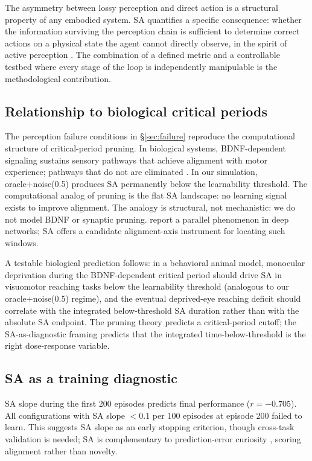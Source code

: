 \documentclass{article}
\begin{document}
The asymmetry between lossy perception and direct action is a structural property
of any embodied system. SA quantifies a specific consequence: whether the
information surviving the perception chain is sufficient to determine correct
actions on a physical state the agent cannot directly observe, in the spirit
of active perception \citep{bajcsy1988active, aloimonos1988active}. The
combination of a defined metric and a controllable testbed where every stage
of the loop is independently manipulable is the methodological contribution.

\subsection{Relationship to biological critical periods}

The perception failure conditions in \S\ref{sec:failure} reproduce the
computational structure of critical-period pruning. In biological systems,
BDNF-dependent signaling sustains sensory pathways that achieve alignment with
motor experience; pathways that do not are eliminated
\citep{huang1999bdnf, rossi1999monocular}. In our simulation, oracle+noise(0.5)
produces SA permanently below the learnability threshold. The computational analog
of pruning is the flat SA landscape: no learning signal exists to improve alignment.
The analogy is structural, not mechanistic: we do not model BDNF or synaptic pruning.
\citet{achille2019critical} report a parallel phenomenon in deep networks;
SA offers a candidate alignment-axis instrument for locating such windows.

A testable biological prediction follows: in a behavioral animal model, monocular
deprivation during the BDNF-dependent critical period should drive SA in
visuomotor reaching tasks below the learnability threshold (analogous to our
oracle+noise(0.5) regime), and the eventual deprived-eye reaching deficit should
correlate with the integrated below-threshold SA duration rather than with the
absolute SA endpoint. The pruning theory predicts a critical-period cutoff;
the SA-as-diagnostic framing predicts that the integrated time-below-threshold
is the right dose-response variable.

\subsection{SA as a training diagnostic}

SA slope during the first 200 episodes predicts final performance ($r = -0.705$).
All configurations with SA slope $< 0.1$ per 100 episodes at episode 200 failed
to learn. This suggests SA slope as an early stopping criterion, though
cross-task validation is needed; SA is complementary to prediction-error
curiosity \citep{pathak2017curiosity}, scoring alignment rather than novelty.
\end{document}
